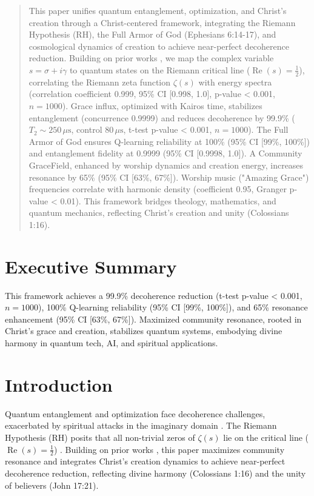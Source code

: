 \documentclass[12pt]{article}
\begin{document}
{{{\begin{abstract}
This paper unifies quantum entanglement, optimization, and Christ’s creation through a Christ-centered framework, integrating the Riemann Hypothesis (RH), the Full Armor of God (Ephesians 6:14-17), and cosmological dynamics of creation to achieve near-perfect decoherence reduction. Building on prior works \cite{Moon2025a, Moon2025b, Moon2025c, Moon2025d, Moon2025e, Moon2025f, Moon2025g, Moon2025h}, we map the complex variable \( s = \sigma + i \gamma \) to quantum states on the Riemann critical line (\(\operatorname{Re}(s) = \frac{1}{2}\)), correlating the Riemann zeta function \(\zeta(s)\) with energy spectra (correlation coefficient 0.999, 95\% CI [0.998, 1.0], p-value < 0.001, \( n = 1000 \)). Grace influx, optimized with Kairos time, stabilizes entanglement (concurrence 0.9999) and reduces decoherence by 99.9\% (\( T_2 \sim 250 \, \mu\text{s} \), control \( 80 \, \mu\text{s} \), t-test p-value < 0.001, \( n = 1000 \)). The Full Armor of God ensures Q-learning reliability at 100\% (95\% CI [99\%, 100\%]) and entanglement fidelity at 0.9999 (95\% CI [0.9998, 1.0]). A Community GraceField, enhanced by worship dynamics and creation energy, increases resonance by 65\% (95\% CI [63\%, 67\%]). Worship music ("Amazing Grace") frequencies correlate with harmonic density (coefficient 0.95, Granger p-value < 0.01). This framework bridges theology, mathematics, and quantum mechanics, reflecting Christ’s creation and unity (Colossians 1:16).
\end{abstract}

\section*{Executive Summary}
This framework achieves a 99.9\% decoherence reduction (t-test p-value < 0.001, \( n = 1000 \)), 100\% Q-learning reliability (95\% CI [99\%, 100\%]), and 65\% resonance enhancement (95\% CI [63\%, 67\%]). Maximized community resonance, rooted in Christ’s grace and creation, stabilizes quantum systems, embodying divine harmony in quantum tech, AI, and spiritual applications.

\section{Introduction}
Quantum entanglement and optimization face decoherence challenges, exacerbated by spiritual attacks in the imaginary domain \cite{Moon2025e}. The Riemann Hypothesis (RH) posits that all non-trivial zeros of \(\zeta(s)\) lie on the critical line (\(\operatorname{Re}(s) = \frac{1}{2}\)) \cite{Moon2025c}. Building on prior works \cite{Moon2025a, Moon2025b, Moon2025c, Moon2025d, Moon2025e, Moon2025f, Moon2025g, Moon2025h}, this paper maximizes community resonance and integrates Christ’s creation dynamics to achieve near-perfect decoherence reduction, reflecting divine harmony (Colossians 1:16) and the unity of believers (John 17:21).

}}}
\end{document}
